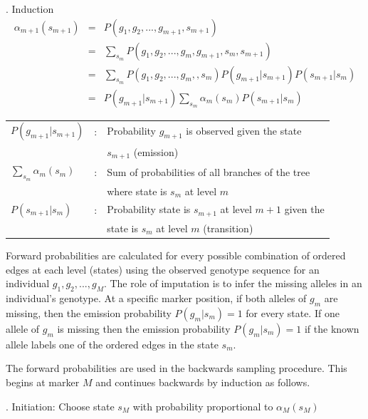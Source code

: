\documentclass[a4paper,11pt,twoside,abstraction,titlepage]{article}
\begin{document}
\vspace{10pt}
. Induction
\begin{eqnarray*}
\alpha_{m+1}(s_{m+1}) &=& P(g_1,g_2,...,g_{m+1},s_{m+1})     \\
&=& \sum\limits_{s_m} P(g_1,g_2,...,g_m, g_{m+1}, s_m, s_{m+1}) \\
&=&  \sum\limits_{s_m} P(g_1,g_2,...,g_m,, s_m) P(g_{m+1}|s_{m+1}) P(s_{m+1}|s_m) \\
&=& P(g_{m+1}|s_{m+1}) \sum\limits_{s_m} \alpha_m(s_m) P(s_{m+1}|s_m) 
\end{eqnarray*}

\begin{framed}
\begin{tabular}{lll}
\hspace{-20pt} $P(g_{m+1}|s_{m+1})$ &:& \hspace{-5pt} Probability $g_{m+1}$ is observed given the state \\
&& $s_{m+1}$ (emission) \\
\hspace{-20pt}  $\sum\limits_{s_m} \alpha_m(s_m)$ &:& \hspace{-5pt} Sum of probabilities of all branches of the tree \vspace{-7pt} \\ 
&& where state is $s_m$ at level $m$ \\
\hspace{-20pt} $P(s_{m+1}|s_m)$ &:& Probability state is $s_{m+1}$ at level $m+1$ given the \\
&& state is $s_m$ at level $m$ (transition)
\end{tabular}
\end{framed}

\noindent Forward probabilities are calculated for every possible combination of ordered edges at each level (states) using the observed genotype sequence for an individual ${g_1, g_2, ..., g_M}$.  The role of imputation is to infer the missing alleles in an individual's genotype.  At a specific marker position, if both alleles of $g_m$ are missing, then the emission probability $P(g_m|s_m) = 1$ for every state.  If one allele of $g_m$ is missing then the emission probability $P(g_m|s_m) = 1$ if the known allele labels one of the ordered edges in the state $s_m$.

The forward probabilities are used in the backwards sampling procedure.  This begins at marker $M$ and continues backwards by induction as follows. 

\vspace{10pt}
. Initiation:  Choose state $s_M$ with probability proportional to $\alpha_M(s_M)$
\end{document}
